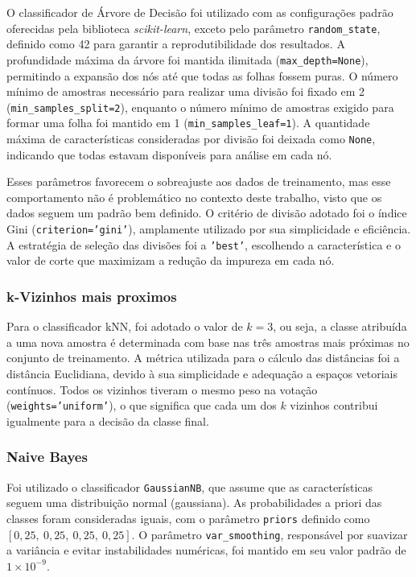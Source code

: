 O classificador de Árvore de Decisão foi utilizado com as configurações padrão oferecidas pela biblioteca \textit{scikit-learn}, exceto pelo parâmetro \texttt{random\_state}, definido como 42 para garantir a reprodutibilidade dos resultados. A profundidade máxima da árvore foi mantida ilimitada (\texttt{max\_depth=None}), permitindo a expansão dos nós até que todas as folhas fossem puras. O número mínimo de amostras necessário para realizar uma divisão foi fixado em 2 (\texttt{min\_samples\_split=2}), enquanto o número mínimo de amostras exigido para formar uma folha foi mantido em 1 (\texttt{min\_samples\_leaf=1}). A quantidade máxima de características consideradas por divisão foi deixada como \texttt{None}, indicando que todas estavam disponíveis para análise em cada nó.

Esses parâmetros favorecem o sobreajuste aos dados de treinamento, mas esse comportamento não é problemático no contexto deste trabalho, visto que os dados seguem um padrão bem definido. O critério de divisão adotado foi o índice Gini (\texttt{criterion='gini'}), amplamente utilizado por sua simplicidade e eficiência. A estratégia de seleção das divisões foi a \texttt{'best'}, escolhendo a característica e o valor de corte que maximizam a redução da impureza em cada nó.

\subsubsection{k-Vizinhos mais proximos}

Para o classificador kNN, foi adotado o valor de $k=3$, ou seja, a classe atribuída a uma nova amostra é determinada com base nas três amostras mais próximas no conjunto de treinamento. A métrica utilizada para o cálculo das distâncias foi a distância Euclidiana, devido à sua simplicidade e adequação a espaços vetoriais contínuos. Todos os vizinhos tiveram o mesmo peso na votação (\texttt{weights='uniform'}), o que significa que cada um dos $k$ vizinhos contribui igualmente para a decisão da classe final.

\subsubsection{Naive Bayes}

Foi utilizado o classificador \texttt{GaussianNB}, que assume que as características seguem uma distribuição normal (gaussiana). As probabilidades a priori das classes foram consideradas iguais, com o parâmetro \texttt{priors} definido como $[0{,}25,\ 0{,}25,\ 0{,}25,\ 0{,}25]$. O parâmetro \texttt{var\_smoothing}, responsável por suavizar a variância e evitar instabilidades numéricas, foi mantido em seu valor padrão de $1 \times 10^{-9}$. 

